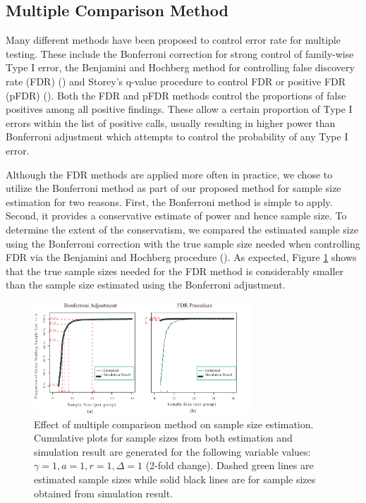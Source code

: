 \documentclass{bioinfo}
\begin{document}
\subsection{Multiple Comparison Method}

Many different methods have been proposed to control error rate for
multiple testing.  These include the Bonferroni correction for
strong control of family-wise Type I error, the Benjamini and
Hochberg method for controlling false discovery rate (FDR)
(\citealp{Benjamini95}) and Storey's q-value procedure to control
FDR or positive FDR (pFDR) (\citealp{Storey02}).  Both the FDR and
pFDR methods control the proportions of false positives among all
positive findings.  These allow a certain proportion of Type I
errors within the list of positive calls, usually resulting in
higher power than Bonferroni adjustment which attempts to control
the probability of any Type I error.

Although the FDR methods are applied more often in practice, we
chose to utilize the Bonferroni method as part of our proposed
method for sample size estimation for two reasons. First, the
Bonferroni method is simple to apply.  Second, it provides a
conservative estimate of power and hence sample size.  To determine
the extent of the conservatism, we compared the estimated sample
size using the Bonferroni correction with the true sample size
needed when controlling FDR via the Benjamini and Hochberg procedure
(\citealp{Benjamini95}). As expected, Figure \ref{fig:ResMtd} shows
that the true sample sizes needed for the FDR method is considerably
smaller than the sample size estimated using the Bonferroni
adjustment.

\begin{figure}[h]
  \centerline{\includegraphics*[width=3.2in]{ResMtd.pdf}}
  \caption[Effect of multiple comparison method on sample size
  estimation] {Effect of multiple comparison method on sample size
  estimation.  Cumulative plots for sample sizes from both
  estimation and simulation result are generated for the following
  variable values: $\gamma = 1, a = 1, r = 1, \Delta = 1$ (2-fold
  change). Dashed green lines are estimated sample sizes while solid
  black lines are for sample sizes obtained from simulation result.}
  \label{fig:ResMtd}
\end{figure}
\end{document}

